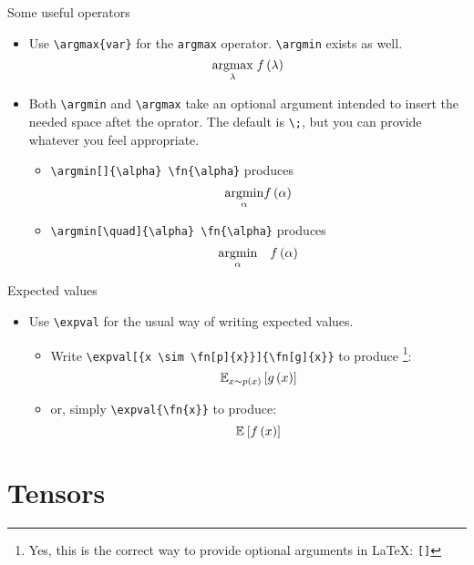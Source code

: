 \documentclass{beamer}
\begin{document}
    \begin{frame}[fragile]{Some useful operators}
        \begin{itemize}
            \item Use \verb!\argmax{var}! for the {\tt argmax} operator. \verb!\argmin! exists as well.
                $$\argmax{\lambda} \fn{\lambda}$$
            \item Both \verb!\argmin! and \verb!\argmax! take an optional argument intended to insert the needed space aftet the oprator. The default is \verb!\;!, but you can provide whatever you feel appropriate.
            \begin{itemize}
                \item \verb!\argmin[]{\alpha} \fn{\alpha}! produces
                    $$ \argmin[]{\alpha} \fn{\alpha} $$
                \item \verb!\argmin[\quad]{\alpha} \fn{\alpha}! produces
                    $$ \argmin[\quad]{\alpha} \fn{\alpha} $$
            \end{itemize}
        \end{itemize}
    \end{frame}

    \begin{frame}[fragile]{Expected values}
        \begin{itemize}
            \item Use \verb!\expval! for the usual way of writing expected values.
                \begin{itemize}
                    \item Write \verb!\expval[{x \sim \fn[p]{x}}]{\fn[g]{x}}! to produce
                    \footnote{Yes, this is the correct way to provide optional arguments
                    in \LaTeX: {\tt []} }:
                    $$\expval[{x \sim \fn[p]{x}}]{ \fn[g]{x} }$$
                    \item or, simply \verb!\expval{\fn{x}}! to produce:
                    $$\expval{\fn{x}}$$
                \end{itemize}
        \end{itemize}
    \end{frame}

\section{Tensors}
\label{sec:tensors}
\end{document}
